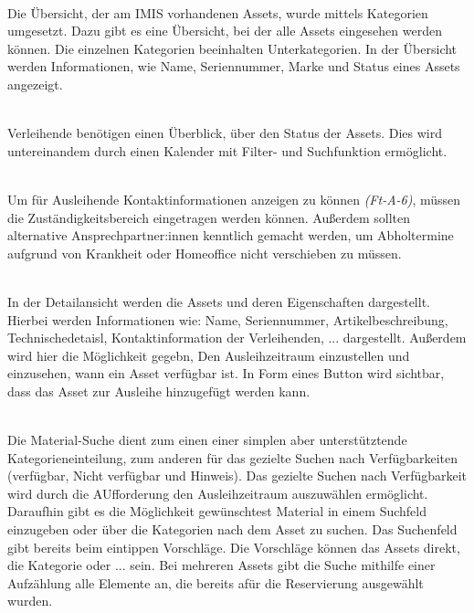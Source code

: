     {\sffamily\color{maincolor}{Ft-V-1 | Übersicht über ausleihbare Assets }}\\
Die Übersicht, der am IMIS vorhandenen Assets, wurde mittels Kategorien
umgesetzt. Dazu gibt es eine Übersicht, bei der alle Assets eingesehen werden
können. Die einzelnen Kategorien beeinhalten Unterkategorien. In der Übersicht
werden Informationen, wie Name, Seriennummer, Marke und Status eines Assets
angezeigt.

    {\sffamily\color{maincolor}{Ft-V-1 |  Verfügbarkeit von Assets }}\\
Verleihende benötigen einen Überblick, über den Status der Assets. Dies wird
untereinandem durch einen Kalender mit Filter- und Suchfunktion ermöglicht.

{\sffamily\color{maincolor}{Ft-V-2 | Zuständigkeitsbereich }}\\
Um für Ausleihende Kontaktinformationen anzeigen zu können \textit{(Ft-A-6)},
müssen die Zuständigkeitsbereich eingetragen werden können. Außerdem sollten
alternative Ansprechpartner:innen kenntlich gemacht werden, um Abholtermine
aufgrund von Krankheit oder Homeoffice nicht verschieben zu müssen.

{\sffamily\color{maincolor}{Ft-A-6 | Detailsansicht }}\\
In der Detailansicht werden die Assets und deren Eigenschaften dargestellt.
Hierbei werden Informationen wie: Name, Seriennummer, Artikelbeschreibung,
Technischedetaisl, Kontaktinformation der Verleihenden, ... dargestellt.
Außerdem wird hier die Möglichkeit gegebn, Den Ausleihzeitraum einzustellen und
einzusehen, wann ein Asset verfügbar ist. In Form eines Button wird sichtbar,
dass das Asset zur Ausleihe hinzugefügt werden kann.

    {\sffamily\color{maincolor}{Ft-A-1 | Material-Suche }}\\
Die Material-Suche dient zum einen einer simplen aber unterstütztende
Kategorieneinteilung, zum anderen für das gezielte Suchen nach Verfügbarkeiten
(verfügbar, Nicht verfügbar und Hinweis). Das gezielte Suchen nach Verfügbarkeit
wird durch die AUfforderung den Ausleihzeitraum auszuwählen ermöglicht.
Daraufhin gibt es die Möglichkeit gewünschtest Material in einem Suchfeld
einzugeben oder über die Kategorien nach dem Asset zu suchen. Das Suchenfeld
gibt bereits beim eintippen Vorschläge. Die Vorschläge können das Assets direkt,
die Kategorie oder ... sein. Bei mehreren Assets gibt die Suche mithilfe einer
Aufzählung alle Elemente an, die bereits afür die Reservierung ausgewählt
wurden.

